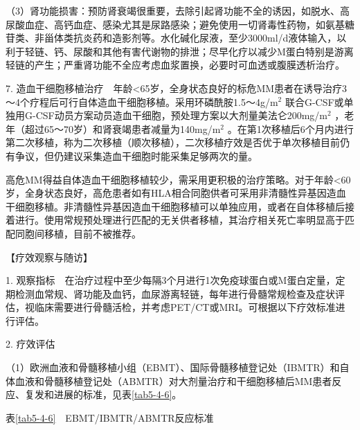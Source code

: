 （3）肾功能损害：预防肾衰竭很重要，去除引起肾功能不全的诱因，如脱水、高尿酸血症、高钙血症、感染尤其是尿路感染；避免使用一切肾毒性药物，如氨基糖苷类、非甾体类抗炎药和造影剂等。水化碱化尿液，至少3000ml/d液体输入，以利于轻链、钙、尿酸和其他有害代谢物的排泄；尽早化疗以减少M蛋白特别是游离轻链的产生；严重肾功能不全应考虑血浆置换，必要时可血透或腹膜透析治疗。

7.
造血干细胞移植治疗　年龄<65岁，全身状态良好的标危MM患者在诱导治疗3～4个疗程后可行自体造血干细胞移植。采用环磷酰胺1.5～4g/m$^2$
联合G-CSF或单独用G-CSF动员方案动员造血干细胞，预处理方案以大剂量美法仑200mg/m$^2$
，老年（超过65～70岁）和肾衰竭患者减量为140mg/m$^2$
。在第1次移植后6个月内进行第二次移植，称为二次移植（顺次移植），二次移植疗效是否优于单次移植目前仍有争议，但仍建议采集造血干细胞时能采集足够两次的量。

高危MM得益自体造血干细胞移植较少，需采用更积极的治疗策略。对于年龄<60岁，全身状态良好，高危患者如有HLA相合同胞供者可采用非清髓性异基因造血干细胞移植。非清髓性异基因造血干细胞移植可以单独应用，或者在自体移植后接着进行。使用常规预处理进行匹配的无关供者移植，其治疗相关死亡率明显高于匹配同胞间移植，目前不被推荐。

【疗效观察与随访】

1.
观察指标　在治疗过程中至少每隔3个月进行1次免疫球蛋白或M蛋白定量，定期检测血常规、肾功能及血钙，血尿游离轻链，每年进行骨髓常规检查及症状评估，视临床需要进行骨髓活检，并考虑PET/CT或MRI。可根据以下疗效标准进行评估。

2. 疗效评估

（1）欧洲血液和骨髓移植小组（EBMT）、国际骨髓移植登记处（IBMTR）和自体血液和骨髓移植登记处（ABMTR）对大剂量治疗和干细胞移植后MM患者反应、复发和进展的标准，见表\ref{tab5-4-6}。

表\ref{tab5-4-6}　EBMT/IBMTR/ABMTR反应标准

